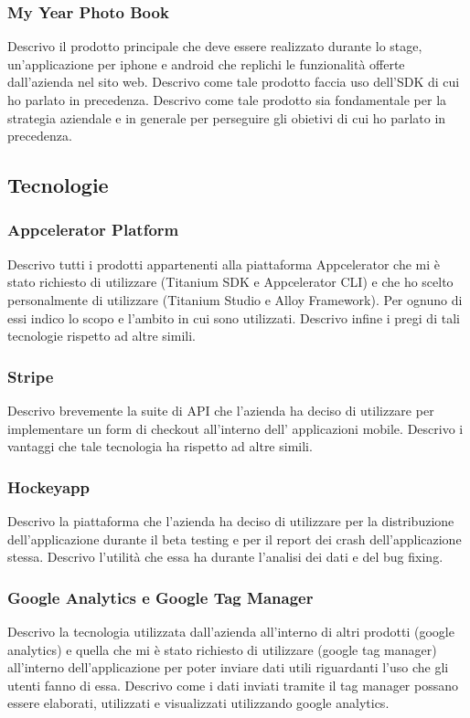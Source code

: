 			\subsubsection{My Year Photo Book}
				Descrivo il prodotto principale che deve essere realizzato durante lo stage, un'applicazione per iphone e android
				che replichi le funzionalità offerte dall'azienda nel sito web. Descrivo come tale prodotto faccia uso dell'SDK
				di cui ho parlato in precedenza. Descrivo come tale prodotto sia fondamentale per la strategia aziendale e in
				generale per perseguire gli obietivi di cui ho parlato in precedenza.
		\subsection{Tecnologie}
			\subsubsection{Appcelerator Platform}
				Descrivo tutti i prodotti appartenenti alla piattaforma Appcelerator che mi è stato richiesto di utilizzare
				(Titanium SDK e Appcelerator CLI) e che ho scelto personalmente di utilizzare (Titanium Studio e Alloy Framework).
				Per ognuno di essi indico lo scopo e l'ambito in cui sono utilizzati. Descrivo infine i pregi di tali tecnologie
				rispetto ad altre simili.
			\subsubsection{Stripe}
				Descrivo brevemente la suite di API che l'azienda ha deciso di utilizzare per implementare un form di checkout
				all'interno dell' applicazioni mobile. Descrivo i vantaggi che tale tecnologia ha rispetto ad altre simili.
			\subsubsection{Hockeyapp}
				Descrivo la piattaforma che l'azienda ha deciso di utilizzare per la distribuzione dell'applicazione durante il
				beta testing e per il report dei crash dell'applicazione stessa. Descrivo l'utilità che essa ha durante l'analisi
				dei dati e del bug fixing.
			\subsubsection{Google Analytics e Google Tag Manager}
				Descrivo la tecnologia utilizzata dall'azienda all'interno di altri prodotti (google analytics) e quella che mi è
				stato richiesto di utilizzare (google tag manager) all'interno dell'applicazione per poter inviare dati utili
				riguardanti l'uso che gli utenti fanno di essa. Descrivo come i dati inviati tramite il tag manager possano essere
				elaborati, utilizzati e visualizzati utilizzando google analytics.
